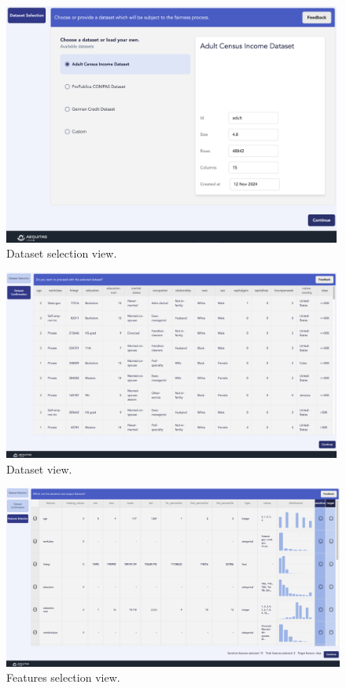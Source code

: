\documentclass[12pt,a4paper,openright,twoside]{book}
\begin{document}
\begin{figure}
    \centering
    \includegraphics[width=0.99\textwidth]{figures/gui/dataset-selection.png}
    \caption{Dataset selection view.}
    \label{fig:dataset-selection}
\end{figure}

\begin{figure}
    \centering
    \includegraphics[width=0.99\textwidth]{figures/gui/dataset-view.png}
    \caption{Dataset view.}
    \label{fig:dataset}
\end{figure}

\begin{figure}
    \centering
    \includegraphics[width=\textwidth]{figures/gui/features.png}
    \caption{Features selection view.}
    \label{fig:features}
\end{figure}
\end{document}
